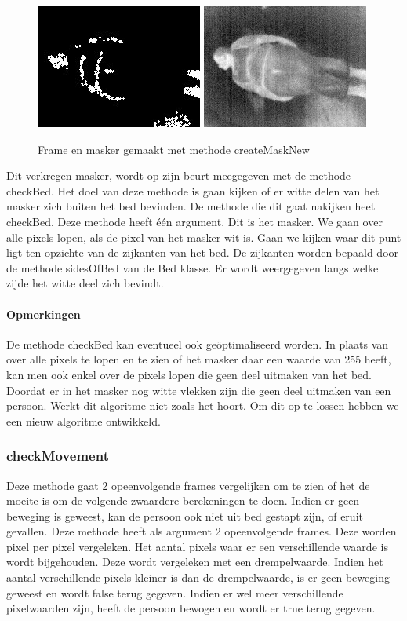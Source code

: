 \begin{figure}[hbp]
	\includegraphics[scale=0.65]{MaskMetDif}
	\includegraphics[scale=0.65]{ImgMetDif}
	\caption{Frame en masker gemaakt met methode createMaskNew}
	\label{imgCMN}
\end{figure} 
Dit verkregen masker, wordt op zijn beurt meegegeven met de methode checkBed. Het doel van deze methode is gaan kijken of er witte delen van het masker zich buiten het bed bevinden. De methode die dit gaat nakijken heet checkBed. Deze methode heeft \'e\'en argument. Dit is het masker. We gaan over alle pixels lopen, als de pixel van het masker wit is. Gaan we kijken waar dit punt ligt ten opzichte van de zijkanten van het bed. De zijkanten worden bepaald door de methode sidesOfBed van de Bed klasse. Er wordt weergegeven langs welke zijde het witte deel zich bevindt.
\paragraph{Opmerkingen}
De methode checkBed kan eventueel ook ge\"optimaliseerd worden. In plaats van over alle pixels te lopen en te zien of het masker daar een waarde van 255 heeft, kan men ook enkel over de pixels lopen die geen deel uitmaken van het bed.
Doordat er in het masker nog witte vlekken zijn die geen deel uitmaken van een persoon. Werkt dit algoritme niet zoals het hoort. Om dit op te lossen hebben we een nieuw algoritme ontwikkeld. 




\subsubsection{checkMovement}
Deze methode gaat 2 opeenvolgende frames vergelijken om te zien of het de moeite is om de volgende zwaardere berekeningen te doen. Indien er geen beweging is geweest, kan de persoon ook niet uit bed gestapt zijn, of eruit gevallen. Deze methode heeft als argument 2 opeenvolgende frames. Deze worden pixel per pixel vergeleken. Het aantal pixels waar er een verschillende waarde is wordt bijgehouden. Deze wordt vergeleken met een drempelwaarde. Indien het aantal verschillende pixels kleiner is dan de drempelwaarde, is er geen beweging geweest en wordt false terug gegeven. Indien er wel meer verschillende pixelwaarden zijn, heeft de persoon bewogen en wordt er true terug gegeven.


